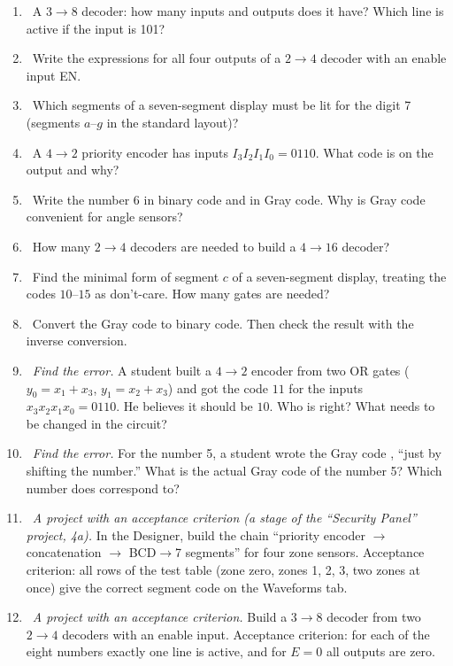 \begin{taskbox}
\begin{enumerate}
  \item {}~A $3\to 8$ decoder: how many inputs and outputs does it have? Which line is active if the input is 101?
  \item {}~Write the expressions for all four outputs of a $2\to 4$ decoder with an enable input EN.
  \item {}~Which segments of a seven-segment display must be lit for the digit 7 (segments $a$--$g$ in the standard layout)?
  \item {}~A $4\to 2$ priority encoder has inputs $I_3I_2I_1I_0 = 0110$. What code is on the output and why?
  \item {}~Write the number 6 in binary code and in Gray code. Why is Gray code convenient for angle sensors?
  \item {}~How many $2\to 4$ decoders are needed to build a $4\to 16$ decoder?
  \item {}~Find the minimal form of segment $c$ of a seven-segment display, treating the codes $10$--$15$ as don't-care. How many gates are needed?
  \item {}~Convert the Gray code  to binary code. Then check the result with the inverse conversion.
  \item {}~\emph{Find the error.} A student built a $4\to2$ encoder from two OR gates ($y_0=x_1+x_3$, $y_1=x_2+x_3$) and got the code $11$ for the inputs $x_3x_2x_1x_0=0110$. He believes it should be $10$. Who is right? What needs to be changed in the circuit?
  \item {}~\emph{Find the error.} For the number 5, a student wrote the Gray code , ``just by shifting the number.'' What is the actual Gray code of the number 5? Which number does  correspond to?
  \item {}~\emph{A project with an acceptance criterion (a stage of the ``Security Panel'' project, 4a).} In the Designer, build the chain ``priority encoder $\to$ concatenation $\to$ BCD$\to$7 segments'' for four zone sensors. Acceptance criterion: all rows of the test table (zone zero, zones 1, 2, 3, two zones at once) give the correct segment code on the Waveforms tab.
  \item {}~\emph{A project with an acceptance criterion.} Build a $3\to8$ decoder from two $2\to4$ decoders with an enable input. Acceptance criterion: for each of the eight numbers exactly one line is active, and for $E=0$ all outputs are zero.

\end{enumerate}
\end{taskbox}
